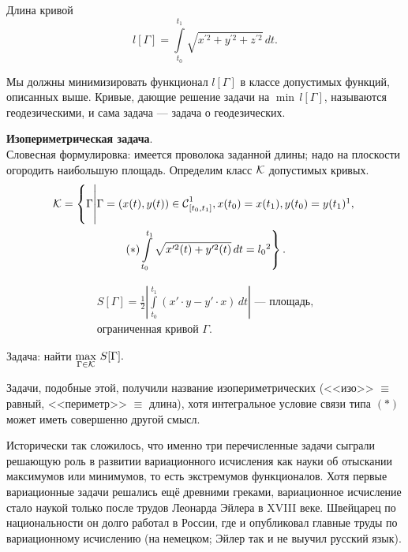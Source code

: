 \begin{enumerate2}
	Длина кривой 
	\begin{equation*}
		 l[\Gamma]=\int\limits_{t_0}^{t_1}\sqrt{x^{\prime 2}+y^{\prime 2}+z^{\prime 2}}\,dt.
	\end{equation*}

	Мы должны минимизировать функционал $l[\Gamma]$ в классе допустимых функций, описанных выше. Кривые, дающие решение задачи на $\min\,l[\Gamma]$, называются геодезическими, и сама задача --- задача о геодезических.
	
	\item \textbf{Изопериметрическая задача}.\\
	Словесная формулировка: имеется проволока заданной длины; надо на плоскости огородить наибольшую площадь. Определим класс $\mathcal{K}$ допустимых кривых.
	\label{l1:eq:Isoperimetr} 
	\begin{multline*}
		\mc{K}=\left\{\Gamma\middle|\Gamma=(x(t),y(t))\in\Cfn[{[t_0,t_1]}]{1}, x(t_0)=x(t_1), y(t_0)=y(t_1)\footnotemark{},\vphantom{\int\limits_{t_0}^{t_1}}\right. \\\left.(*)\int\limits_{t_0}^{t_1}\sqrt{x^{\prime 2}(t)+y^{\prime 2}(t)}\,dt=l_0\footnotemark{}\right\}.
	\end{multline*}%
	\addtocounter{footnote}{-1}\addtocounter{footnote}{1}
	\begin{multline*}
		S[\Gamma]=\frac12\left|\int\limits_{t_0}^{t_1}\left(x'\cdot y-y'\cdot x\right)\,dt\right|\text{ --- площадь,}\\\text{ограниченная кривой }\Gamma.
	\end{multline*}
	
	Задача: найти $\max\limits_{\Gamma\in\mathcal{K}}\,S[\Gamma].$
	
	Задачи, подобные этой, получили название изопериметрических (<<изо>> $\equiv$ равный,  <<периметр>> $\equiv$ длина), хотя интегральное условие связи типа $(\hyperref[l1:eq:Isoperimetr]{*})$ может иметь совершенно другой смысл.
\end{enumerate2}

Исторически так сложилось, что именно три перечисленные задачи сыграли решающую роль в развитии вариационного исчисления как науки об отыскании максимумов или минимумов, то есть экстремумов функционалов. Хотя первые вариационные задачи решались ещё древними греками, вариационное исчисление стало наукой только после трудов Леонарда Эйлера в XVIII веке. Швейцарец по национальности он долго работал в России, где и опубликовал главные труды по вариационному исчислению (на немецком; Эйлер так и не выучил русский язык). 
\vfill
